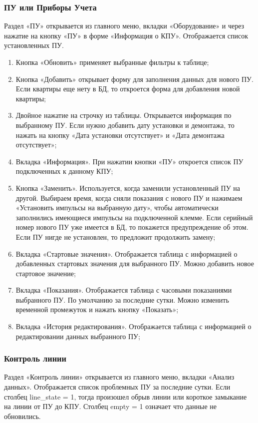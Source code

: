 \subsubsection{ПУ или Приборы Учета}
Раздел «ПУ» открывается из главного меню, вкладки «Оборудование» и через нажатие на кнопку «ПУ» в форме «Информация о КПУ». Отображается список установленных ПУ. 
\begin{enumerate}
	\item Кнопка «Обновить» применяет выбранные фильтры к таблице;
	\item Кнопка «Добавить» открывает форму для заполнения данных для нового ПУ. Если квартиры еще нету в БД, то откроется форма для добавления новой квартиры;
	\item Двойное нажатие на строчку из таблицы. Открывается информация по выбранному ПУ. Если нужно добавить дату установки и демонтажа, то нажать на кнопку «Дата установки отсутствует» и «Дата демонтажа отсутствует»;
	\item Вкладка «Информация». При нажатии кнопки «ПУ» откроется список ПУ подключенных к данному КПУ;
	\item Кнопка «Заменить». Используется, когда заменили установленный ПУ на другой. Выбираем время, когда сняли показания с нового ПУ и нажимаем «Установить импульсы на выбранную дату», чтобы автоматически заполнились имеющиеся импульсы на подключенной клемме. Если серийный номер нового ПУ уже имеется в БД, то покажется предупреждение об этом. Если ПУ нигде не установлен, то предложит продолжить замену;
	\item Вкладка «Стартовые значения». Отображается таблица с информацией о добавленных стартовых значения для выбранного ПУ. Можно добавить новое стартовое значение;
	\item Вкладка «Показания». Отображается таблица с часовыми показаниями выбранного ПУ. По умолчанию за последние сутки. Можно изменить временной промежуток и нажать кнопку «Показать»;
	\item Вкладка «История редактирования». Отображается таблица с информацией о редактировании данных выбранного ПУ;
\end{enumerate}
	
\subsubsection{Контроль линии}
Раздел «Контроль линии» открывается из главного меню, вкладки «Анализ данных». Отображается список проблемных ПУ за последние сутки. Если столбец line\_state = 1, тогда произошел обрыв линии или короткое замыкание на линии от ПУ до КПУ. Столбец empty = 1 означает что данные не обновились. 
